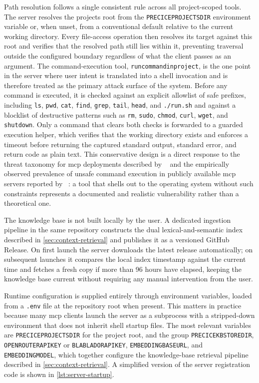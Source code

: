 \documentclass[
  numbers=noenddot,
  english,
  a4paper,
  twoside,
  bibliography=totoc,
  headsepline,
  cleardoublepage=empty,
  parskip=half,
  draft=false
]{scrbook}
\theoremstyle{break}
\renewcommand{\_}{\textunderscore\allowbreak}
\begin{document}
Path resolution follows a single consistent rule across all project-scoped tools. The server
resolves the projects root from the \texttt{PRECICE\_PROJECTS\_DIR} environment variable or,
when unset, from a conventional default relative to the current working directory. Every
file-access operation then resolves its target against this root and verifies that the
resolved path still lies within it, preventing traversal outside the configured boundary
regardless of what the client passes as an argument. The command-execution tool,
\texttt{run\_command\_in\_project}, is the one point in the server where user intent is
translated into a shell invocation and is therefore treated as the primary attack surface of
the system. Before any command is executed, it is checked against an explicit allowlist of
safe prefixes, including \texttt{ls}, \texttt{pwd}, \texttt{cat}, \texttt{find},
\texttt{grep}, \texttt{tail}, \texttt{head}, and \texttt{./run.sh} and against a
blocklist of destructive patterns such as \texttt{rm}, \texttt{sudo}, \texttt{chmod},
\texttt{curl}, \texttt{wget}, and \texttt{shutdown}. Only a command that clears both checks
is forwarded to a guarded execution helper, which verifies that the working directory exists
and enforces a timeout before returning the captured standard output, standard error, and
return code as plain text. This conservative design is a direct response to the threat
taxonomy for \gls{mcp} deployments described by
\citeauthor{hou2025mcplandscape}~\cite{hou2025mcplandscape} and the empirically observed
prevalence of unsafe command execution in publicly available \gls{mcp} servers reported by
\citeauthor{hasan2025mcpfirstglance}~\cite{hasan2025mcpfirstglance}: a tool that shells out
to the operating system without such constraints represents a documented and realistic
vulnerability rather than a theoretical one.

The knowledge base is not built locally by the user. A dedicated ingestion pipeline in the
same repository constructs the dual lexical-and-semantic index described in
\cref{sec:context-retrieval} and publishes it as a versioned GitHub Release. On first launch
the server downloads the latest release automatically; on subsequent launches it compares the
local index timestamp against the current time and fetches a fresh copy if more than 96 hours
have elapsed, keeping the knowledge base current without requiring any manual intervention
from the user.

Runtime configuration is supplied entirely through environment variables, loaded from a
\texttt{.env} file at the repository root when present. This matters in practice because
many \gls{mcp} clients launch the server as a subprocess with a stripped-down environment
that does not inherit shell startup files. The most relevant variables are
\texttt{PRECICE\_PROJECTS\_DIR} for the project root, and the group
\texttt{PRECICE\_KB\_STORE\_DIR}, \texttt{OPENROUTER\_API\_KEY} or
\texttt{BLABLADOR\_API\_KEY}, \texttt{EMBEDDING\_BASE\_URL}, and \texttt{EMBEDDING\_MODEL},
which together configure the knowledge-base retrieval pipeline described in
\cref{sec:context-retrieval}. A simplified version of the server registration code is shown
in \cref{lst:server-startup}.
\end{document}
